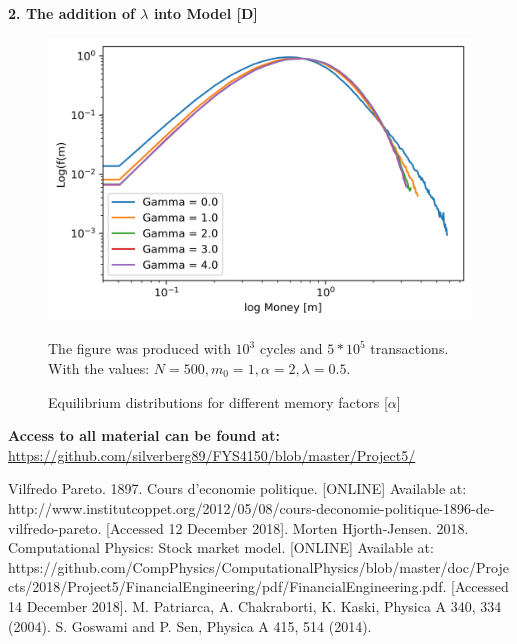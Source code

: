 \documentclass[a4paper,11pt]{article}
\begin{document}
\textbf{2. The addition of $\lambda$ into Model [D]}
\begin{figure}[H]
	\includegraphics[scale=1]{figures/relationship_mem_save_1000c_200000t.png} 
	\caption{Equilibrium distributions for different memory factors [$\alpha$]}
{\small The figure was produced with $10^3$ cycles and $5*10^5$ transactions.
\\With the values: $N = 500, m_0 = 1, \alpha = 2, \lambda = 0.5$. }
\end{figure}

\textbf{Access to all material can be found at:}
\\
\url{https://github.com/silverberg89/FYS4150/blob/master/Project5/}

\begin{thebibliography}{9}
      Vilfredo Pareto. 1897. Cours d’economie politique. [ONLINE] Available at: http://www.institutcoppet.org/2012/05/08/cours-deconomie-politique-1896-de-vilfredo-pareto. [Accessed 12 December 2018].
	 Morten Hjorth-Jensen. 2018. Computational Physics: Stock market model. [ONLINE] Available at: https://github.com/CompPhysics/ComputationalPhysics/blob/master/doc/Projects/2018/Project5/FinancialEngineering/pdf/FinancialEngineering.pdf. [Accessed 14 December 2018].
      M. Patriarca, A. Chakraborti, K. Kaski, Physica A 340, 334 (2004).
      S. Goswami and P. Sen, Physica A 415, 514 (2014).
\end{thebibliography}
\end{document}
